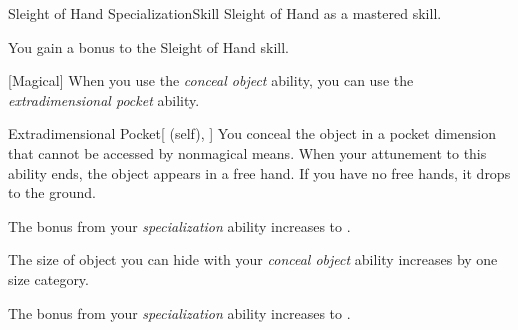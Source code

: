     \begin{feat}{Sleight of Hand Specialization}{Skill}
        \featpre Sleight of Hand as a mastered skill.

         You gain a  bonus to the Sleight of Hand skill.


        [Magical] When you use the \textit{conceal object} ability, you can use the \textit{extradimensional pocket} ability.
        \begin{attuneability}{Extradimensional Pocket}[ (self), ]
            You conceal the object in a pocket dimension that cannot be accessed by nonmagical means.
            When your attunement to this ability ends, the object appears in a free hand.
            If you have no free hands, it drops to the ground.
        \end{attuneability}

         The bonus from your \textit{specialization} ability increases to .

         The size of object you can hide with your \textit{conceal object} ability increases by one size category.

         The bonus from your \textit{specialization} ability increases to .

    \end{feat}

